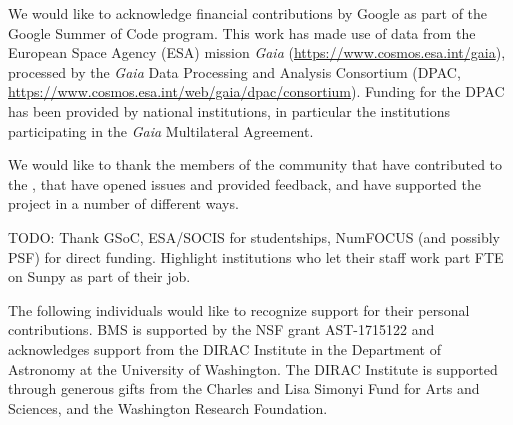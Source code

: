 \acknowledgments

We would like to acknowledge financial contributions by Google as part of the Google Summer of Code program.
This work has made use of data from the European Space Agency (ESA) mission {\it Gaia} (\url{https://www.cosmos.esa.int/gaia}), processed by the {\it Gaia} Data Processing and Analysis Consortium (DPAC, \url{https://www.cosmos.esa.int/web/gaia/dpac/consortium}).
Funding for the DPAC has been provided by national institutions, in particular the institutions participating in the {\it Gaia} Multilateral Agreement.

We would like to thank the members of the community that have contributed to the \sunpyproj, that have opened issues and provided feedback, and have supported the project in a number of different ways.

TODO: Thank GSoC, ESA/SOCIS for studentships, NumFOCUS (and possibly PSF) for direct funding.
Highlight institutions who let their staff work part FTE on Sunpy as part of their job.

The following individuals would like to recognize support for their personal contributions.
BMS is supported by the NSF grant AST-1715122 and acknowledges support from the DIRAC Institute in the Department of Astronomy at the University of Washington.
The DIRAC Institute is supported through generous gifts from the Charles and Lisa Simonyi Fund for Arts and Sciences, and the Washington Research Foundation.
